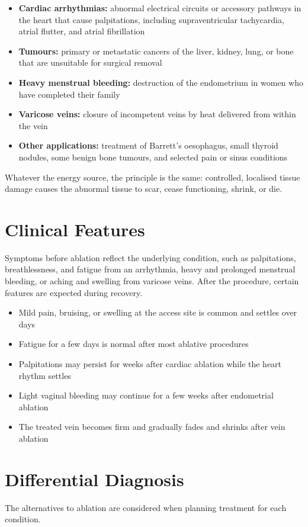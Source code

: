 \begin{itemize}
    \item \textbf{Cardiac arrhythmias:} abnormal electrical circuits or accessory pathways in the heart that cause palpitations, including supraventricular tachycardia, atrial flutter, and atrial fibrillation
    \item \textbf{Tumours:} primary or metastatic cancers of the liver, kidney, lung, or bone that are unsuitable for surgical removal
    \item \textbf{Heavy menstrual bleeding:} destruction of the endometrium in women who have completed their family
    \item \textbf{Varicose veins:} closure of incompetent veins by heat delivered from within the vein
    \item \textbf{Other applications:} treatment of Barrett's oesophagus, small thyroid nodules, some benign bone tumours, and selected pain or sinus conditions
\end{itemize}

Whatever the energy source, the principle is the same: controlled, localised tissue damage causes the abnormal tissue to scar, cease functioning, shrink, or die.

\section*{Clinical Features}
Symptoms before ablation reflect the underlying condition, such as palpitations, breathlessness, and fatigue from an arrhythmia, heavy and prolonged menstrual bleeding, or aching and swelling from varicose veins. After the procedure, certain features are expected during recovery.

\begin{itemize}
    \item Mild pain, bruising, or swelling at the access site is common and settles over days
    \item Fatigue for a few days is normal after most ablative procedures
    \item Palpitations may persist for weeks after cardiac ablation while the heart rhythm settles
    \item Light vaginal bleeding may continue for a few weeks after endometrial ablation
    \item The treated vein becomes firm and gradually fades and shrinks after vein ablation
\end{itemize}

\section*{Differential Diagnosis}
The alternatives to ablation are considered when planning treatment for each condition.

